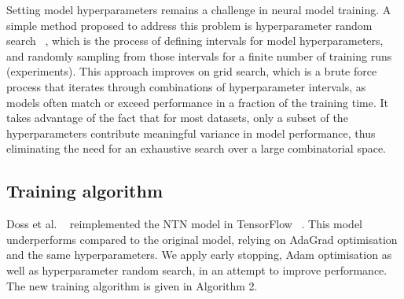 \noindent Setting model hyperparameters remains a challenge in neural model training. A simple method proposed to address this problem is hyperparameter random search \unskip ~\citep{bergstra2012random}, which is the process of defining intervals for model hyperparameters, and randomly sampling from those intervals for a finite number of training runs (experiments). This approach improves on grid search, which is a brute force process that iterates through combinations of hyperparameter intervals, as models often match or exceed performance in a fraction of the training time. It takes advantage of the fact that for most datasets, only a subset of the hyperparameters contribute meaningful variance in model performance, thus eliminating the need for an exhaustive search over a large combinatorial space. \par

\subsection{Training algorithm}

Doss et al. \unskip~\citep{Doss2015} reimplemented the NTN model in TensorFlow \unskip ~\citep{abadi2016tensorflow}. This model underperforms compared to the original model, relying on AdaGrad optimisation and the same hyperparameters. We apply early stopping, Adam optimisation as well as hyperparameter random search, in an attempt to improve performance. The new training algorithm is given in Algorithm 2. 

\medskip

